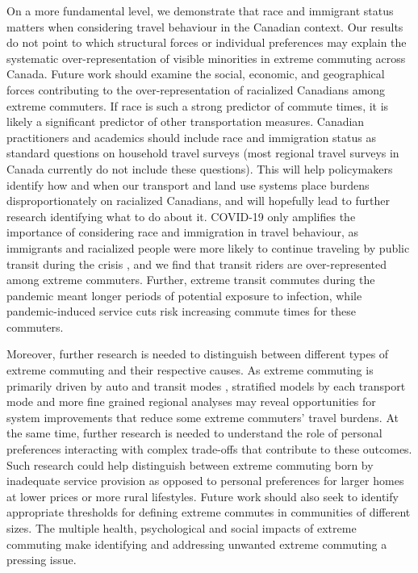 \documentclass[10 pt,letterpaper]{article}
\begin{document}
On a more fundamental level, we demonstrate that race and immigrant status matters when considering travel behaviour in the Canadian context. Our results do not point to which structural forces or individual preferences may explain the systematic over-representation of visible minorities in extreme commuting across Canada. Future work should examine the social, economic, and geographical forces contributing to the over-representation of racialized Canadians among extreme commuters. If race is such a strong predictor of commute times, it is likely a significant predictor of other transportation measures. Canadian practitioners and academics should include race and immigration status as standard questions on household travel surveys (most regional travel surveys in Canada currently do not include these questions). This will help policymakers identify how and when our transport and land use systems place burdens disproportionately on racialized Canadians, and will hopefully lead to further research identifying what to do about it.  COVID-19 only amplifies the importance of considering race and immigration in travel behaviour, as immigrants and racialized people were more likely to continue traveling by public transit during the crisis \cite{palm_allen21}, and we find that transit riders are over-represented among extreme commuters. Further, extreme transit commutes during the pandemic meant longer periods of potential exposure to infection, while pandemic-induced service cuts risk increasing commute times for these commuters.

Moreover, further research is needed to distinguish between different types of extreme commuting and their respective causes. As extreme commuting is primarily driven by auto and transit modes \cite{marion_comparison_2007, maoh_determinants_2012-1, vincent-geslin_determinants_2016, bai_exploring_2020}, stratified models by each transport mode and more fine grained regional analyses may reveal opportunities for system improvements that reduce some extreme commuters' travel burdens. At the same time, further research is needed to understand the role of personal preferences interacting with complex trade-offs that contribute to these outcomes. Such research could help distinguish between extreme commuting born by inadequate service provision as opposed to personal preferences for larger homes at lower prices or more rural lifestyles. Future work should also seek to identify appropriate thresholds for defining extreme commutes in communities of different sizes. The multiple health, psychological and social impacts of extreme commuting make identifying and addressing unwanted extreme commuting a pressing issue.
\end{document}
